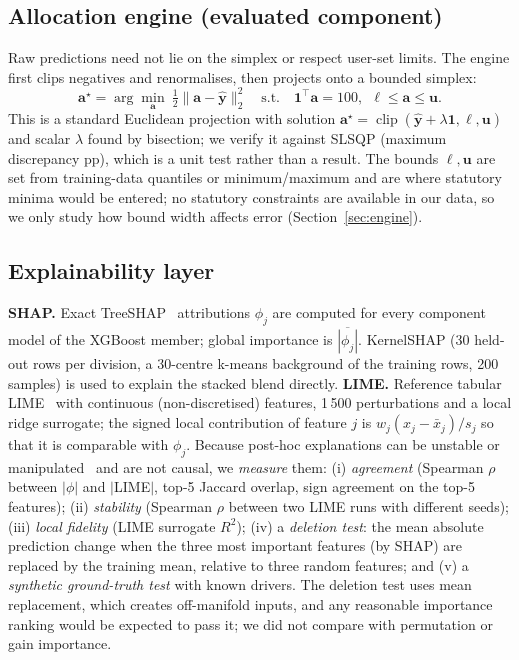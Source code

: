 \subsection{Allocation engine (evaluated component)}
Raw predictions need not lie on the simplex or respect user-set limits. The engine first clips negatives and renormalises, then projects onto a bounded simplex:
\begin{equation}
\mathbf{a}^\star=\arg\min_{\mathbf{a}}\ \tfrac12\|\mathbf{a}-\hat{\mathbf{y}}\|_2^2\quad\text{s.t.}\quad \mathbf{1}^{\!\top}\mathbf{a}=100,\ \ \boldsymbol{\ell}\le\mathbf{a}\le\mathbf{u}.
\end{equation}
This is a standard Euclidean projection with solution $\mathbf{a}^\star=\operatorname{clip}(\hat{\mathbf{y}}+\lambda\mathbf{1},\boldsymbol{\ell},\mathbf{u})$ and scalar $\lambda$ found by bisection; we verify it against SLSQP (maximum discrepancy \NSlsqpDiff{} pp), which is a unit test rather than a result. The bounds $\boldsymbol{\ell},\mathbf{u}$ are set from training-data quantiles or minimum/maximum and are where statutory minima would be entered; no statutory constraints are available in our data, so we only study how bound width affects error (Section~\ref{sec:engine}).

\subsection{Explainability layer}
\textbf{SHAP.} Exact TreeSHAP~\cite{lundberg2017,lundberg2020} attributions $\phi_{j}$ are computed for every component model of the XGBoost member; global importance is $\overline{|\phi_j|}$. KernelSHAP (30 held-out rows per division, a 30-centre k-means background of the training rows, 200 samples) is used to explain the stacked blend directly. \textbf{LIME.} Reference tabular LIME~\cite{ribeiro2016} with continuous (non-discretised) features, 1\,500 perturbations and a local ridge surrogate; the signed local contribution of feature $j$ is $w_j(x_j-\bar{x}_j)/s_j$ so that it is comparable with $\phi_j$. Because post-hoc explanations can be unstable or manipulated~\cite{alvarezmelis2018,slack2020} and are not causal, we \emph{measure} them: (i) \emph{agreement} (Spearman $\rho$ between $|\phi|$ and $|$LIME$|$, top-5 Jaccard overlap, sign agreement on the top-5 features); (ii) \emph{stability} (Spearman $\rho$ between two LIME runs with different seeds); (iii) \emph{local fidelity} (LIME surrogate $R^2$); (iv) a \emph{deletion test}: the mean absolute prediction change when the three most important features (by SHAP) are replaced by the training mean, relative to three random features; and (v) a \emph{synthetic ground-truth test} with known drivers. The deletion test uses mean replacement, which creates off-manifold inputs, and any reasonable importance ranking would be expected to pass it; we did not compare with permutation or gain importance.

